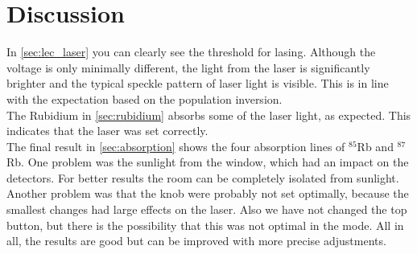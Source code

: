 \section{Discussion}
\label{sec:Diskussion}
In \autoref{sec:lec_laser} you can clearly see the threshold for lasing.
Although the voltage is only minimally different, the light from the laser is significantly brighter and the typical speckle pattern of laser light is visible.
This is in line with the expectation based on the population inversion.
\\
The Rubidium in \autoref{sec:rubidium} absorbs some of the laser light, as expected.
This indicates that the laser was set correctly.
\\
The final result in \autoref{sec:absorption} shows the four absorption lines of $^{85}$Rb and $^{87}$Rb.
One problem was the sunlight from the window, which had an impact on the detectors.
For better results the room can be completely isolated from sunlight.
\\
Another problem was that the knob were probably not set optimally, because the smallest changes had large effects on the laser.
Also we have not changed the top button, but there is the possibility that this was not optimal in the mode.
All in all, the results are good but can be improved with more precise adjustments.